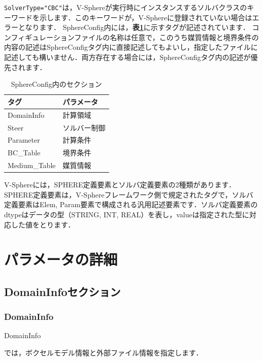 \noindent \verb|SolverType="CBC"|は，V-Sphereが実行時にインスタンスするソルバクラスのキーワードを示します．このキーワードが，V-Sphereに登録されていない場合はエラーとなります．
SphereConfig内には，\textbf{表\ref{tbl:SphereConfig_tag}}に示すタグが記述されています．
コンフィギュレーションファイルの名称は任意で，このうち媒質情報と境界条件の内容の記述はSphereConfigタグ内に直接記述してもよいし，指定したファイルに記述しても構いません．両方存在する場合には，SphereConfigタグ内の記述が優先されます．\\

\begin{table}[htdp]
\caption{SphereConfig内のセクション}
\begin{center}
\small
\begin{tabular}{ll} \toprule
タグ & パラメータ\\ \midrule
DomainInfo & 計算領域\\
Steer & ソルバー制御\\
Parameter & 計算条件\\
BC\_Table & 境界条件\\
Medium\_Table & 媒質情報\\ \bottomrule
\end{tabular}
\end{center}
\label{tbl:SphereConfig_tag}
\end{table}


V-Sphereには，SPHERE定義要素とソルバ定義要素の2種類があります．SPHERE定義要素は，V-Sphereフレームワーク側で規定されたタグで，ソルバ定義要素はElem, Param要素で構成される汎用記述要素です．ソルバ定義要素のdtypeはデータの型（STRING, INT, REAL）を表し，valueは指定された型に対応した値をとります．

\pagebreak
%
\section{パラメータの詳細}
%
\subsection{DomainInfoセクション}
%
\subsubsection{DomainInfo}

\hypertarget{tgt:domaininfo}{DomainInfo}では，ボクセルモデル情報と外部ファイル情報を指定します．

